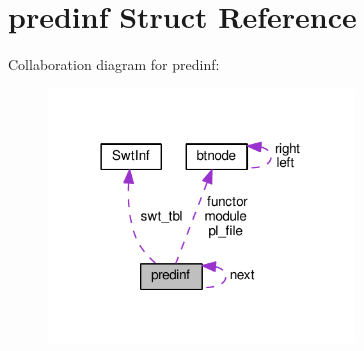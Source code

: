 \hypertarget{structpredinf}{}\section{predinf Struct Reference}
\label{structpredinf}


Collaboration diagram for predinf\+:\nopagebreak
\begin{figure}[H]
\begin{center}
\leavevmode
\includegraphics[width=230pt]{structpredinf__coll__graph}
\end{center}
\end{figure}
